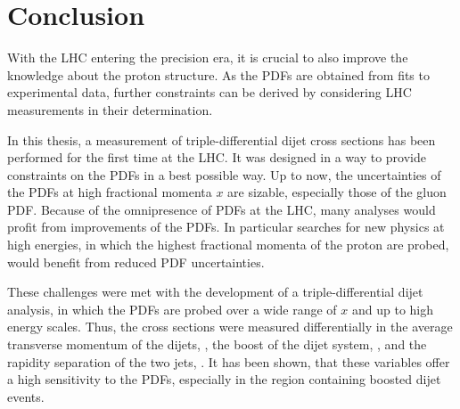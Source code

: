 
\chapter{Conclusion}

With the LHC entering the precision era, it is crucial to also improve the
knowledge about the proton structure. As the PDFs are obtained from fits to
experimental data, further constraints can be derived by considering LHC
measurements in their determination.

In this thesis, a measurement of triple-differential dijet cross sections has
been performed for the first time at the LHC. It was designed in a
way to provide constraints on the PDFs in a best possible way. Up to now, the
uncertainties of the PDFs at high fractional momenta $x$ are sizable,
especially those of the gluon PDF. Because of the omnipresence of
PDFs at the LHC, many analyses would profit from improvements of the PDFs.
In particular searches for new physics at high energies, in which the highest
fractional momenta of the proton are probed, would benefit from reduced PDF
uncertainties.

These challenges were met with the development of a triple-differential dijet
analysis, in which the PDFs are probed over a wide range of $x$ and up to high
energy scales. Thus, the cross sections were measured differentially in the
average transverse momentum of the dijets, \ptavg, the boost of the dijet
system, \yboost, and the rapidity separation of the two jets, \ystar. It has
been shown, that these variables offer a high sensitivity to the PDFs,
especially in the region containing boosted dijet events.

